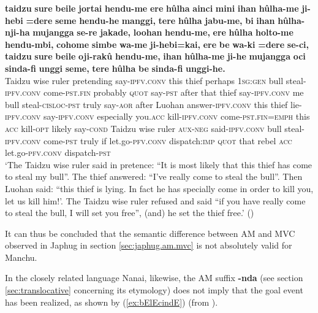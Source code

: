 \documentclass{article}
\newcommand{\ipa}[1]{\textbf{{\phon\mbox{#1}}}} %
\begin{document}
\begin{exe}
\ex \label{ex:huulhanjiha}
\gll
\ipa{taidzu} 	\ipa{sure} 	\ipa{beile} 	\ipa{jortai} 	\ipa{hendu-me} 	\ipa{ere} 	\ipa{hûlha} 	\ipa{ainci} 	\ipa{mini} 	\ipa{ihan} 	\ipa{hûlha-me} 	\ipa{ji-hebi} 	\ipa{=dere} 	\ipa{seme} 	\ipa{hendu-he} 	\ipa{manggi,} 	\ipa{tere} 	\ipa{hûlha} 	\ipa{jabu-me,} 	\ipa{bi} 	\ipa{ihan} 	\ipa{hûlha-nji-ha} 	\ipa{mujangga} 	\ipa{se-re} 	\ipa{jakade,} 	\ipa{loohan} 	\ipa{hendu-me,} 	\ipa{ere} 	\ipa{hûlha} 	\ipa{holto-me} 	\ipa{hendu-mbi,} 	\ipa{cohome} 	\ipa{simbe} 	\ipa{wa-me} 	\ipa{ji-hebi=kai,} 	\ipa{ere} 	\ipa{be} 	\ipa{wa-ki} 	\ipa{=dere} 	\ipa{se-ci,} 	\ipa{taidzu} 	\ipa{sure} 	\ipa{beile} 	\ipa{oji-rakû} 	\ipa{hendu-me,} 	\ipa{ihan} 	\ipa{hûlha-me} 	\ipa{ji-he} 	\ipa{mujangga} 	\ipa{oci} 	\ipa{sinda-fi} 	\ipa{unggi} 	\ipa{seme,} 	\ipa{tere} 	\ipa{hûlha} 	\ipa{be} 	\ipa{sinda-fi} 	\ipa{unggi-he.} \\
Taidzu wise ruler pretending say-\textsc{ipfv.conv} this thief perhaps \textsc{1sg:gen} bull steal-\textsc{ipfv.conv} come-\textsc{pst.fin} probably \textsc{quot} say-\textsc{pst} after that thief say-\textsc{ipfv.conv} me bull steal-\textsc{cisloc-pst} truly say-\textsc{aor} after Luohan answer-\textsc{ipfv.conv} this thief lie-\textsc{ipfv.conv} say-\textsc{ipfv.conv} especially you.\textsc{acc} kill-\textsc{ipfv.conv} come-\textsc{pst.fin}=\textsc{emph} this \textsc{acc} kill-\textsc{opt} likely say-\textsc{cond} Taidzu wise ruler \textsc{aux-neg} said-\textsc{ipfv.conv} bull steal-\textsc{ipfv.conv} come-\textsc{pst} truly if let.go-\textsc{pfv.conv} dispatch:\textsc{imp} \textsc{quot} that rebel \textsc{acc} let.go-\textsc{pfv.conv} dispatch-\textsc{pst} \\
\glt  `The Taidzu wise ruler said in pretence: “It is most likely that this thief has come to steal my bull”. The thief answered: “I’ve really come to steal the bull”. Then Luohan said: “this thief is lying. In fact he has specially come in order to kill you, let us kill him!’. The Taidzu wise ruler refused and said “if you have really come to steal the bull, I will set you free”, (and) he set the thief free.' (\citealt[35;171-172]{shunjuu92yargiyan})
\end{exe}


It can thus be concluded that the semantic difference between AM and MVC observed in Japhug in section \ref{sec:japhug.am.mvc} is not absolutely valid for Manchu.

In the closely related language Nanai, likewise, the AM suffix  \ipa{-nda} (see section \ref{sec:translocative} concerning its etymology) does not imply that the goal event has been realized, as shown by (\ref{ex:bElEcindE}) (from \citealt[89]{stojnova16nda}).
\end{document}
